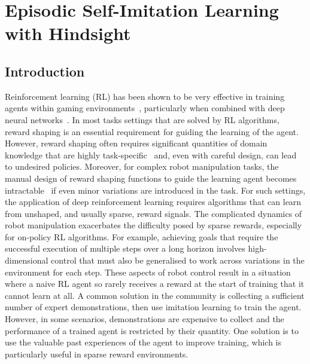 \chapter{Episodic Self-Imitation Learning with Hindsight}
\label{ch:esil}
\section{Introduction}
Reinforcement learning (RL) has been shown to be very effective in training agents within gaming environments~\cite{mnih2015human,silver2016mastering}, particularly when combined with deep neural networks~\cite{lecun2015deep,silver2016mastering,liu2017survey}. In most tasks settings that are solved by RL algorithms, reward shaping is an essential requirement for guiding the learning of the agent. However, reward shaping often requires significant quantities of domain knowledge that {are} highly task-specific~\cite{ng1999policy} and, even with careful design, can lead to undesired policies. Moreover, for complex robot manipulation tasks, the manual design of reward shaping functions to guide the learning agent becomes intractable~\cite{arulkumaran2017deep,florensa2017reverse} if even minor variations are introduced in the task. For such settings, the application of deep reinforcement learning requires algorithms that can learn from unshaped, and usually sparse, reward signals. The complicated dynamics of robot manipulation exacerbates the difficulty posed by sparse rewards, especially for on-policy RL algorithms. For example, achieving goals that require the successful execution of multiple steps over a long horizon involves high-dimensional control that must also be generalised to work across variations in the environment for each step. These aspects of robot control result in a situation where a naive RL agent so rarely receives a reward at the start of training that it cannot learn at all. A common solution in the  community is collecting a sufficient number of expert demonstrations, then use imitation learning to train the agent. However, in some scenarios, demonstrations are expensive to collect and the performance of a trained agent is restricted by their quantity. One solution is to use the valuable past experiences of the agent to improve training, which is particularly useful in sparse reward environments.

